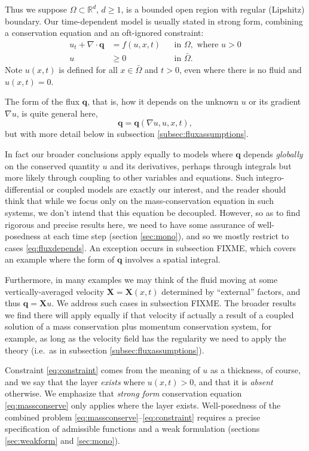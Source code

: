 \documentclass[final,leqno,onefignum,onetabnum]{siamltex1213bueler}
\newcommand\bq{\mathbf{q}}
\newcommand\bX{\mathbf{X}}
\newcommand{\Div}{\nabla\cdot}
\renewcommand{\grad}{\nabla}
\newcommand\RR{\mathbb{R}}
\begin{document}
Thus we suppose $\Omega \subset \RR^d$, $d\ge 1$, is a bounded open region with regular (Lipshitz) boundary.  Our time-dependent model is usually stated in strong form, combining a conservation equation and an oft-ignored constraint:
\begin{align}
u_t + \Div \bq &= f(u,x,t) &&\text{in } \Omega, \text{ where } u > 0 \label{eq:massconserve} \\
u &\ge 0 &&\text{in } \bar\Omega. \label{eq:constraint}
\end{align}
Note $u(x,t)$ is defined for all $x\in \bar\Omega$ and $t>0$, even where there is no fluid and $u(x,t)=0$.

The form of the flux $\bq$, that is, how it depends on the unknown $u$ or its gradient $\grad u$, is quite general here,
\begin{equation}
\bq = \bq(\grad u,u,x,t), \label{eq:fluxdepends}
\end{equation}
but with more detail below in subsection \ref{subsec:fluxassumptions}.

In fact our broader conclusions apply equally to models where $\bq$ depends \emph{globally} on the conserved quantity $u$ and its derivatives, perhaps through integrals but more likely through coupling to other variables and equations.  Such integro-differential or coupled models are exactly our interest, and the reader should think that while we focus only on the mass-conservation equation in such systems, we don't intend that this equation be decoupled.  However, so as to find rigorous and precise results here, we need to have some assurance of well-posedness at each time step (section \ref{sec:mono}), and so we mostly restrict to cases \eqref{eq:fluxdepends}.  An exception occurs in subsection FIXME, which covers an example where the form of $\bq$ involves a spatial integral.

Furthermore, in many examples we may think of the fluid moving at some vertically-averaged velocity $\bX=\bX(x,t)$ determined by ``external'' factors, and thus $\bq = \bX u$.  We address such cases in subsection FIXME.  The broader results we find there will apply equally if that velocity if actually a result of a coupled solution of a mass conservation plus momentum conservation system, for example, as long as the velocity field has the regularity we need to apply the theory (i.e.~as in subsection \ref{subsec:fluxassumptions}).

Constraint \eqref{eq:constraint} comes from the meaning of $u$ as a thickness, of course, and we say that the layer \emph{exists} where $u(x,t)>0$, and that it is \emph{absent} otherwise.  We emphasize that \emph{strong form} conservation equation \eqref{eq:massconserve} only applies where the layer exists.  Well-posedness of the combined problem \eqref{eq:massconserve}--\eqref{eq:constraint} requires a precise specification of admissible functions and a weak formulation (sections \ref{sec:weakform} and \ref{sec:mono}).
\end{document}
